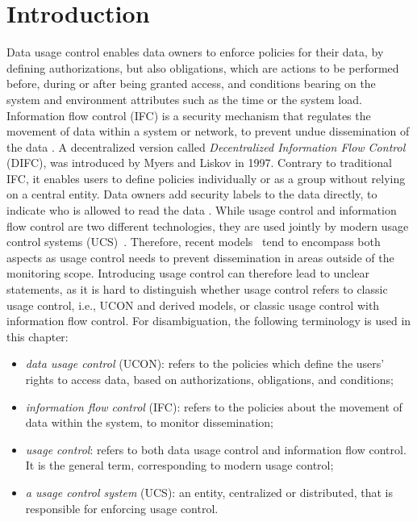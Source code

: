 \minitoc
\section{Introduction}
Data usage control enables data owners to enforce policies for their data, 
by defining authorizations, but also obligations, which are actions to be performed before, during or after being granted access, and conditions bearing on the system and environment attributes such as the time or the system load.
Information flow control (IFC) is a security mechanism that regulates the movement of data within 
a system or network, to prevent undue dissemination of the data \cite{Denning1976}. A decentralized version called \emph{Decentralized Information Flow Control} (DIFC), was introduced by Myers and Liskov in 1997. Contrary to traditional IFC, it enables users to define policies individually or as a group without relying on a central entity. Data owners add security labels to the data directly, to indicate who is allowed to read the data \cite{Myers1997}.
While usage control and information flow control are two different technologies, they are used jointly by modern usage control systems (UCS)~\cite{Harvan2009}. Therefore, recent models~\cite{Kelbert2018, Fromm2020} tend to encompass both aspects as usage control needs to prevent dissemination in areas outside of the monitoring scope. Introducing usage control can therefore lead to unclear statements, as it is hard to distinguish whether usage control refers to classic usage control, i.e., UCON and derived models, or classic usage control with information flow control. For disambiguation, the following terminology is used
in this chapter:
  
\begin{itemize}
    \item \emph{data usage control} (UCON): refers to the policies which define the users' rights to access data, based on authorizations, obligations, and conditions;
    \item \emph{information flow control} (IFC): refers to the policies about the movement of data within the system, to monitor dissemination;
    \item \emph{usage control}: refers to both data usage control and information flow control. It is the general term, corresponding to modern usage control;
    \item \emph{a usage control system} (UCS): an entity, centralized or distributed, that is responsible for enforcing usage control.
\end{itemize}

